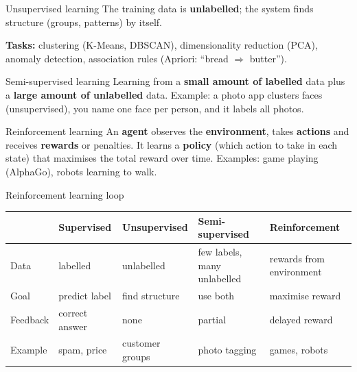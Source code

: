 \begin{dfn}{Unsupervised learning}
The training data is \textbf{unlabelled}; the system finds structure (groups, patterns) by itself.
\end{dfn}
\textbf{Tasks:} clustering (K-Means, DBSCAN), dimensionality reduction (PCA), anomaly detection, association rules (Apriori: ``bread $\Rightarrow$ butter'').

\begin{dfn}{Semi-supervised learning}
Learning from a \textbf{small amount of labelled} data plus a \textbf{large amount of unlabelled} data. Example: a photo app clusters faces (unsupervised), you name one face per person, and it labels all photos.
\end{dfn}

\begin{dfn}{Reinforcement learning}
An \textbf{agent} observes the \textbf{environment}, takes \textbf{actions} and receives \textbf{rewards} or penalties. It learns a \textbf{policy} (which action to take in each state) that maximises the total reward over time. Examples: game playing (AlphaGo), robots learning to walk.
\end{dfn}

\begin{drawit}{Reinforcement learning loop}
\centering
{}
\end{drawit}

\begin{center}
\small
\begin{tabular}{@{}p{2.0cm}p{3.3cm}p{3.3cm}p{3.3cm}p{3.3cm}@{}}
\toprule
 & \textbf{Supervised} & \textbf{Unsupervised} & \textbf{Semi-supervised} & \textbf{Reinforcement}\\
\midrule
Data & labelled & unlabelled & few labels, many unlabelled & rewards from environment\\
Goal & predict label & find structure & use both & maximise reward\\
Feedback & correct answer & none & partial & delayed reward\\
Example & spam, price & customer groups & photo tagging & games, robots\\
\bottomrule
\end{tabular}
\end{center}

